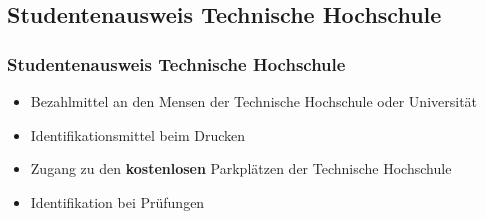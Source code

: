\documentclass[10pt,a4paper]{beamer}
\begin{document}
    \subsection*{Studentenausweis Technische Hochschule}
    \begin{frame}
        \frametitle{Studentenausweis Technische Hochschule}
        \begin{itemize}
            \setlength{\itemsep}{10pt} %
            \item Bezahlmittel an den Mensen der Technische Hochschule oder Universität
            \item Identifikationsmittel beim Drucken %
            \item Zugang zu den \textbf{kostenlosen} Parkplätzen der Technische Hochschule
            \item Identifikation bei Prüfungen
        \end{itemize}
    \end{frame}

\end{document}
